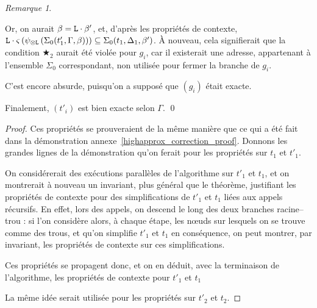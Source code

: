 \documentclass[11pt,a4paper]{article}
\theoremstyle{plain}
\theoremstyle{definition}
\theoremstyle{remark}
\newtheorem{remark}{Remarque}
\newcommand*{\tensor}{\otimes}
\newcommand*{\someperm}{\varsigma}
\newcommand*{\sequent}{\Gamma}
\newcommand*{\sequentbis}{\Delta}
\newcommand*{\Left}{\textnormal{\texttt{L}}}
\newcommand*{\lowapprox}{\ensuremath{\Sigma_0}}
\newcommand*{\exactcondbis}{\bigstar_2}
\begin{document}
\begin{remark}
\begin{itemize}
            Or, on aurait $\beta = \Left \cdot \beta'$, et, d'après les propriétés de contexte, $\Left \cdot \someperm \left( \psi_{\tensor\Left} \left(\lowapprox(t'_1, \sequent, \beta)\right) \right) \subseteq \lowapprox(t_1, \sequentbis_1, \beta')$. À nouveau, cela signifierait que la condition $\exactcondbis$ aurait été violée pour $g_i$, car il existerait une adresse, appartenant à l'ensemble $\lowapprox$ correspondant, non utilisée pour fermer la branche de $g_i$. 
            
            C'est encore absurde, puisqu'on a supposé que $(g_i)$ était exacte.
    \end{itemize}

    Finalement, $(t'_i)$ est bien exacte selon $\sequent$. \qed
\end{remark}

\begin{proof}
    Ces propriétés se prouveraient de la même manière que ce qui a été fait dans la démonstration annexe~\ref{highapprox_correction_proof}. Donnons les grandes lignes de la démonstration qu'on ferait pour les propriétés sur $t_1$ et $t'_1$.
    
    On considérerait des exécutions parallèles de l'algorithme sur $t'_1$ et $t_1$, et on montrerait à nouveau un invariant, plus général que le théorème, justifiant les propriétés de contexte pour des simplifications de $t'_1$ et $t_1$ liées aux appels récursifs. En effet, lors des appels, on descend le long des deux branches racine--trou : si l'on considère alors, à chaque étape, les n\oe uds sur lesquels on se trouve comme des trous, et qu'on simplifie $t'_1$ et $t_1$ en conséquence, on peut montrer, par invariant, les propriétés de contexte sur ces simplifications.

    Ces propriétés se propagent donc, et on en déduit, avec la terminaison de l'algorithme, les propriétés de contexte pour $t'_1$ et $t_1$
    
    La même idée serait utilisée pour les propriétés sur $t'_2$ et $t_2$.
\end{proof}
\end{document}
